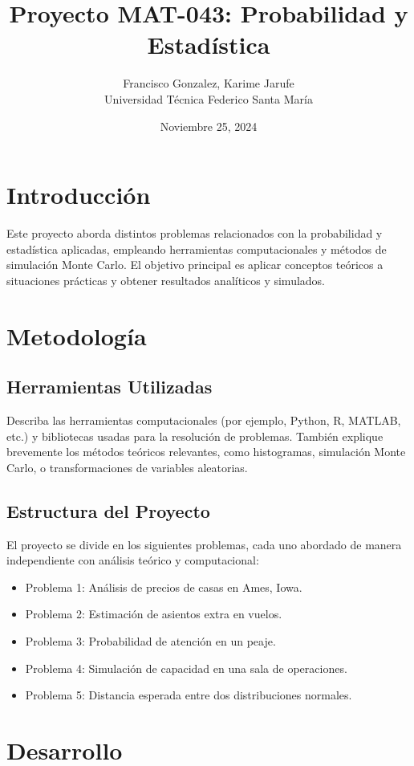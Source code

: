 \documentclass[12pt]{article}
\title{Proyecto MAT-043: Probabilidad y Estadística}
\author{Francisco Gonzalez, Karime Jarufe\\ Universidad Técnica Federico Santa María}
\date{Noviembre 25, 2024}
\begin{document}
\maketitle

\tableofcontents
\newpage

\section{Introducción}
Este proyecto aborda distintos problemas relacionados con la probabilidad y estadística aplicadas, empleando herramientas computacionales y métodos de simulación Monte Carlo. El objetivo principal es aplicar conceptos teóricos a situaciones prácticas y obtener resultados analíticos y simulados.

\section{Metodología}
\subsection{Herramientas Utilizadas}
Describa las herramientas computacionales (por ejemplo, Python, R, MATLAB, etc.) y bibliotecas usadas para la resolución de problemas. También explique brevemente los métodos teóricos relevantes, como histogramas, simulación Monte Carlo, o transformaciones de variables aleatorias.

\subsection{Estructura del Proyecto}
El proyecto se divide en los siguientes problemas, cada uno abordado de manera independiente con análisis teórico y computacional:
\begin{itemize}
    \item Problema 1: Análisis de precios de casas en Ames, Iowa.
    \item Problema 2: Estimación de asientos extra en vuelos.
    \item Problema 3: Probabilidad de atención en un peaje.
    \item Problema 4: Simulación de capacidad en una sala de operaciones.
    \item Problema 5: Distancia esperada entre dos distribuciones normales.
\end{itemize}

\newpage

\section{Desarrollo}
\end{document}
